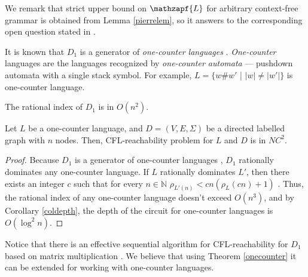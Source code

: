 We remark that strict upper bound on $\mathzapf{L}$ for arbitrary context-free grammar is obtained from Lemma \ref{pierrelem}, so it answers to the corresponding open question stated in \cite{HellingsCFPQ}.


It is known that $D_1$ is a generator of \textit{one-counter languages} \cite{GreibHier}. \textit{One-counter} languages are the languages recognized by \textit{one-counter automata} --- pushdown automata with a single stack symbol. For example, $L = \{w\#w'$ | $|w| \neq |w'|\}$ is one-counter language.



\begin{lemma}
\label{dyck1lem}
The rational index of $D_1$ is in $O(n^2)$.
\end{lemma}
\begin{theorem}
\label{onecounter}
Let $L$ be a one-counter language, and $D=(V, E, \Sigma)$ be a directed labelled graph with $n$ nodes. Then, CFL-reachability problem for $L$ and $D$ is in $NC^2$.
\end{theorem}
\begin{proof} 
Because $D_1$ is a generator of one-counter languages \cite{GreibHier}, $D_1$ rationally dominates any one-counter language. If $L$ rationally dominates $L'$, then there exists an integer $c$ such that for every $n \in \mathbb{N}$ $\rho_{L'(n)} < cn(\rho_L(cn) + 1)$ \cite{RatBasic}.  Thus, the rational index of any one-counter language doesn't exceed $O(n^3)$, and by Corollary \ref{coldepth}, the depth of the circuit for one-counter languages is $O(\log^2 n)$.
\end{proof}


Notice that there is an effective sequential algorithm for CFL-reachability for $D_1$ based on matrix multiplication \cite{Bradford}. We believe that using Theorem \ref{onecounter} it can be extended for working with one-counter languages.

